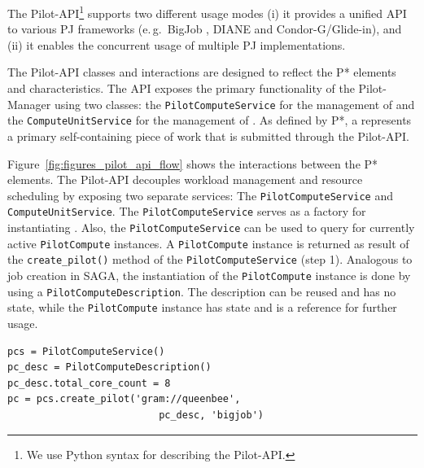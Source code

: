 \documentclass{sig-alternate}
\begin{document}
The Pilot-API\footnote{We use Python syntax for describing the
  Pilot-API.}  supports two different usage modes (i) it provides a
unified API to various PJ frameworks (e.\,g.\ BigJob , DIANE and
Condor-G/Glide-in), and (ii) it enables the concurrent usage of
multiple PJ implementations.

The Pilot-API classes and interactions are designed to reflect the P*
elements and characteristics.
The API exposes the primary functionality of the Pilot-Manager using two
classes: the \texttt{Pilot\-Compute\-Service} for the management of \pilots
and the \texttt{Compute\-Unit\-Service} for the management of \cus. 
As defined by P*, a \cu represents a primary self-containing piece of work that
is submitted through the Pilot-API. 

Figure~\ref{fig:figures_pilot_api_flow} shows the interactions between the
P* elements.
The Pilot-API decouples workload management and resource scheduling by exposing
two separate services: The \texttt{Pilot\-Compute\-Service} and
\texttt{Compute\-Unit\-Service}. 
The \texttt{Pilot\-Compute\-Service} serves as a factory for instantiating \pilots. 
Also, the \texttt{Pilot\-Compute\-Service} can be used to query for currently
active \texttt{Pilot\-Compute} instan\-ces.
A \texttt{Pilot\-Compute} instance is returned as result of the
\texttt{create\_pilot()} method of the \texttt{Pi\-lot\-Compute\-Service} (step 1).
Analogous to job creation in SAGA, the instantiation of the
\texttt{Pilot\-Compute} instance is done by using a
\texttt{Pilot\-ComputeDescription}. The description can be reused and has no
state, while the \texttt{Pilot\-Compute} instance has state and is a reference
for further usage.\\

\lstset{
language=Python,
frame=single,
captionpos=b,
stringstyle=\ttfamily,
basicstyle=\scriptsize\ttfamily
}

\begin{minipage}{0.45 \textwidth}
\begin{lstlisting}[caption={\textbf{Pilot Creation:} Instantiation of a \texttt{PilotComputeService} using a \texttt{PilotComputeDescription}.}, label={lst:pcs_creation}]
pcs = PilotComputeService()
pc_desc = PilotComputeDescription()
pc_desc.total_core_count = 8
pc = pcs.create_pilot('gram://queenbee', 
                          pc_desc, 'bigjob')
\end{lstlisting}
\end{minipage}
\end{document}
